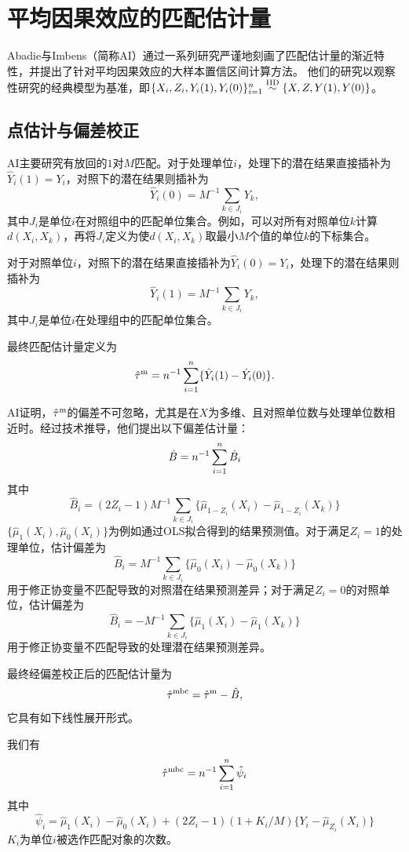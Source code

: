  

\section{平均因果效应的匹配估计量}

Abadie与Imbens（简称AI）通过一系列研究严谨地刻画了匹配估计量的渐近特性，并提出了针对平均因果效应的大样本置信区间计算方法。
他们的研究以观察性研究的经典模型为基准，即$\{ X_i , Z_i ,Y_i(1), Y_i(0)  \}_{i=1}^n \stackrel{\textup{IID}}{\sim} \{ X, Z, Y(1), Y(0) \}$。  

\subsection{点估计与偏差校正}

AI主要研究有放回的$1$对$M$匹配。对于处理单位$i$，处理下的潜在结果直接插补为$\hat{Y}_i(1) = Y_i$，对照下的潜在结果则插补为$$
\hat{Y}_i(0) = M^{-1} \sum_{k\in J_i} Y_k,
$$其中$J_i$是单位$i$在对照组中的匹配单位集合。例如，可以对所有对照单位$k$计算$d(X_i, X_k)$，再将$J_i$定义为使$d(X_i, X_k)$取最小$M$个值的单位$k$的下标集合。 




对于对照单位$i$，对照下的潜在结果直接插补为$\hat{Y}_i(0) = Y_i$，处理下的潜在结果则插补为$$
\hat{Y}_i(1) = M^{-1} \sum_{k\in J_i} Y_k,
$$其中$J_i$是单位$i$在处理组中的匹配单位集合。

最终匹配估计量定义为
$$
\hat{\tau}^\textup{m} = n^{-1} \sum_{i=1}^n \{\hat{Y}_i(1) -\hat{Y}_i(0) \}.
$$

AI证明，$\hat{\tau}^\textup{m}$的偏差不可忽略，尤其是在$X$为多维、且对照单位数与处理单位数相近时。经过技术推导，他们提出以下偏差估计量：$$
\hat{B} = n^{-1} \sum_{i=1}^n  \hat{B}_i
$$其中$$
\hat{B}_i = (2Z_i - 1) M^{-1} \sum_{k\in J_i} \{  \hat{\mu}_{1-Z_i}(X_i) -  \hat{\mu}_{1-Z_i}(X_k)     \}
$$$\{  \hat{\mu}_1(X_i), \hat{\mu}_0(X_i) \}$为例如通过OLS拟合得到的结果预测值。对于满足$Z_i  =1$的处理单位，估计偏差为$$
\hat{B}_i = M^{-1} \sum_{k\in J_i} \{  \hat{\mu}_{0}(X_i) -  \hat{\mu}_{0}(X_k)     \}
$$用于修正协变量不匹配导致的对照潜在结果预测差异；对于满足$Z_i = 0$的对照单位，估计偏差为$$
\hat{B}_i =  - M^{-1} \sum_{k\in J_i} \{  \hat{\mu}_{1}(X_i) -  \hat{\mu}_{1}(X_k)     \}
$$用于修正协变量不匹配导致的处理潜在结果预测差异。 


最终经偏差校正后的匹配估计量为
$$
\hat{\tau}^\textup{mbc} = \hat{\tau}^\textup{m}  - \hat{B},
$$
它具有如下线性展开形式。
 
 \begin{proposition}
 \label{prop::matching-expansion-ate} 我们有 
\begin{eqnarray}\label{eq::linearATE}
\hat{\tau}^\textup{mbc}  
= n^{-1} \sum_{i=1}^n \hat{\psi}_i
\end{eqnarray} 
其中 
$$
  \hat{\psi}_i = \hat{\mu}_1(X_i) -  \hat{\mu}_0(X_i) + (2Z_i - 1) (1+K_i/M) \{   Y_i - \hat{\mu}_{Z_i}(X_i)  \}
 $$
$K_i$为单位$i$被选作匹配对象的次数。 
 \end{proposition}
 
